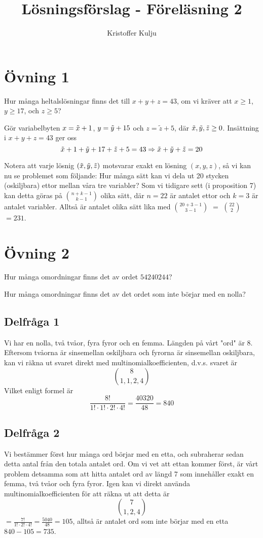 \documentclass{article}
\title{Lösningsförslag - Föreläsning 2}
\author{Kristoffer Kulju}
\begin{document}
\maketitle

\section*{Övning 1}
\begin{xca}
  Hur många heltalslösningar finns det till $x + y + z = 43$, om vi kräver att $x \geq 1$, $y \geq 17$, och $z \geq 5$?
\end{xca}

Gör variabelbyten $x=\Tilde{x} + 1$, $y = \Tilde{y} + 15$ och $z=\tilde{z}+5$, där $\Tilde{x}, \Tilde{y}, \Tilde{z}\geq 0$. Insättning i $x+y+z=43$ ger oss $$
\Tilde{x} + 1 + \Tilde{y} + 17 + \Tilde{z} + 5 = 43 \Rightarrow  \Tilde{x} +  \Tilde{y} +  \Tilde{z}= 20
$$

Notera att varje lösnig $(\Tilde{x}, \Tilde{y}, \Tilde{z})$ motsvarar exakt en lösning $(x, y, z)$, så vi kan nu se problemet som följande: Hur många sätt kan vi dela ut 20 stycken (oskiljbara) ettor mellan våra tre variabler? Som vi tidigare sett (i proposition 7) kan detta göras på $n + k - 1 \choose k - 1$ olika sätt, där $n=22$ är antalet ettor och $k=3$ är antalet variabler. Alltså är antalet olika sätt lika med $20 + 3 - 1 \choose 3 - 1$ $=$ $22 \choose 2$ $=231$. 

\section*{Övning 2}
\begin{xca}
  Hur många omordningar finns det av ordet $54240244$?

  Hur många omordningar finns det av det ordet som inte börjar med en nolla?
\end{xca}

\subsection*{Delfråga 1}
Vi har en nolla, två tvåor, fyra fyror och en femma. Längden på vårt "ord" är 8. Eftersom tvåorna är sinsemellan oskiljbara och fyrorna är sinsemellan oskiljbara, kan vi räkna ut svaret direkt med multinomialkoefficienten, d.v.s. svaret är $$
8 \choose 1, 1, 2, 4 
$$
Vilket enligt formel är $$
\frac{8!}{1!\cdot1!\cdot2!\cdot4!} = \frac{40320}{48}=840
$$
\subsection*{Delfråga 2}
Vi bestämmer först hur många ord börjar med en etta, och subraherar sedan detta antal från den totala antalet ord. Om vi vet att ettan kommer först, är vårt problem detsamma som att hitta antalet ord av längd 7 som innehåller exakt en femma, två tvåor och fyra fyror. Igen kan vi direkt använda multinomialkoefficienten för att räkna ut att detta är $$
7 \choose 1, 2, 4
$$
$=\frac{7!}{1!\cdot 2!\cdot 4!}=\frac{5040}{48}=105$, alltså är antalet ord som inte börjar med en etta $840-105=735$. 
\end{document}
